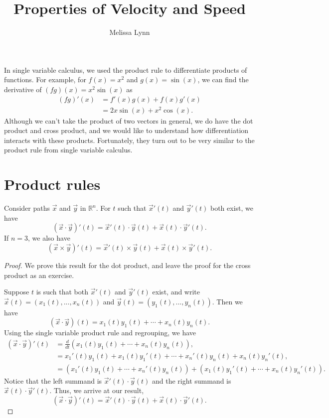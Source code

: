 \documentclass{ximera}
\title{Properties of Velocity and Speed}
\author{Melissa Lynn}
\begin{document}
\begin{abstract}
\end{abstract}
\maketitle

In single variable calculus, we used the product rule to differentiate products of functions. For example, for $f(x) = x^2$ and $g(x) = \sin(x)$, we can find the derivative of $(fg)(x) = x^2\sin(x)$ as
\begin{align*}
(fg)'(x) &= f'(x)g(x)+f(x)g'(x)\\
&= 2x\sin(x)+x^2\cos(x).
\end{align*}
Although we can't take the product of two vectors in general, we do have the dot product and cross product, and we would like to understand how differentiation interacts with these products. Fortunately, they turn out to be very similar to the product rule from single variable calculus. 

\section*{Product rules}

\begin{proposition}
Consider paths $\vec{x}$ and $\vec{y}$ in $\mathbb{R}^n$. For $t$ such that $\vec{x}'(t)$ and $\vec{y}'(t)$ both exist, we have
\[
(\vec{x}\cdot\vec{y})'(t) = \vec{x}'(t)\cdot \vec{y}(t) + \vec{x}(t)\cdot \vec{y}'(t).
\]
If $n=3$, we also have
\[
(\vec{x}\times \vec{y})'(t) = \vec{x}'(t)\times \vec{y}(t) + \vec{x}(t)\times \vec{y}'(t).
\]
\end{proposition}

\begin{proof}
We prove this result for the dot product, and leave the proof for the cross product as an exercise.

Suppose $t$ is such that both $\vec{x}'(t)$ and $\vec{y}'(t)$ exist, and write $\vec{x}(t) = (x_1(t),...,x_n(t))$ and $\vec{y}(t) = (y_1(t),...,y_n(t))$. Then we have
\[
(\vec{x}\cdot\vec{y})(t) = x_1(t)y_1(t) + \cdots + x_n(t)y_n(t).
\]
Using the single variable product rule and regrouping, we have
\begin{align*}
(\vec{x}\cdot\vec{y})'(t) & = \frac{d}{dt}\left(x_1(t)y_1(t) + \cdots + x_n(t)y_n(t)\right),\\
& = x_1'(t) y_1(t) + x_1(t)y_1'(t) +\cdots+x_n'(t) y_n(t) + x_n(t)y_n'(t),\\
& = \left(x_1'(t) y_1(t) + \cdots + x_n'(t) y_n(t)\right) + \left(x_1(t) y_1'(t) + \cdots + x_n(t) y_n'(t)\right).
\end{align*}
Notice that the left summand is $\vec{x}'(t)\cdot\vec{y}(t)$ and the right summand is $\vec{x}(t)\cdot\vec{y}'(t)$. Thus, we arrive at our result,
\[
(\vec{x}\cdot\vec{y})'(t) = \vec{x}'(t)\cdot \vec{y}(t) + \vec{x}(t)\cdot \vec{y}'(t).
\]
\end{proof}
\end{document}
